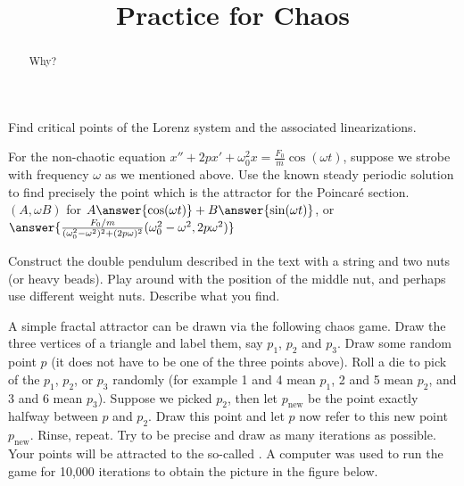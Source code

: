 \documentclass{ximera}
\title{Practice for Chaos}
\begin{document}
\begin{abstract}
Why?
\end{abstract}
\maketitle


\begin{exercise}%
    Find critical points of the Lorenz system and the associated linearizations.
\end{exercise}

\begin{exercise}
    For the non-chaotic equation $x''+2p x' + \omega_0^2 x = \frac{F_0}{m} \cos (\omega t)$, suppose we strobe with frequency $\omega$ as we mentioned above.  Use the known steady periodic solution to find precisely the point which is the attractor for the Poincar\'e section.\\
    $(A, \omega B)$ for $A \answer{\cos(\omega t)} + B \answer{\sin(\omega t)}$, or $\answer{\frac{F_0/m}{(\omega_0^2 - \omega^2)^2 + (2p\omega)^2}(\omega_0^2 - \omega^2, 2p\omega^2)}$
\end{exercise}

\begin{exercise}%
    Construct the double pendulum described in the text with a string and two nuts (or heavy beads).  Play around with the position of the middle nut, and perhaps use different weight nuts.  Describe what you find.
\end{exercise}


\begin{exercise}%
    A simple fractal attractor can be drawn via the following chaos game.  Draw the three vertices of a triangle and label them, say $p_1$, $p_2$ and $p_3$.  Draw some random point $p$ (it does not have to be one of the three points above). Roll a die to pick of the $p_1$, $p_2$, or $p_3$ randomly (for example 1 and 4 mean $p_1$, 2 and 5 mean $p_2$, and 3 and 6 mean $p_3$).  Suppose we picked $p_2$, then let $p_{\text{new}}$ be the point exactly halfway between $p$ and $p_2$.  Draw this point and let $p$ now refer to this new point $p_{\text{new}}$.  Rinse, repeat.  Try to be precise and draw as many iterations as possible.  Your points will be attracted to the so-called \emph{}.  A computer was used to run the game for 10,000 iterations to obtain the picture in the figure below.
\end{exercise}
\end{document}

